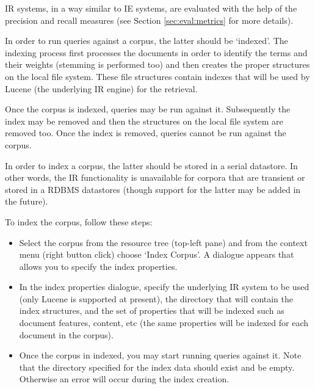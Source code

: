 IR systems, in a way similar to IE systems, are evaluated with the
help of the precision and recall measures (see Section
\ref{sec:eval:metrics} for more details).



In order to run queries against a corpus, the latter should be
`indexed'. The indexing process first processes the documents in order
to identify the terms and their weights (stemming is performed too)
and then creates the proper structures on the local file system. These
file structures contain indexes that will be used by Lucene (the
underlying IR engine) for the retrieval.

Once the corpus is indexed, queries may be run against
it. Subsequently the index may be removed and then the structures on
the local file system are removed too. Once the index is removed,
queries cannot be run against the corpus.


In order to index a corpus, the latter should be stored in a serial
datastore. In other words, the IR functionality is unavailable for
corpora that are transient or stored in a RDBMS datastores (though
support for the latter may be added in the future).

To index the corpus, follow these steps:

\begin{itemize}
%
\item
Select the corpus from the resource tree (top-left pane) and from the
context menu (right button click) choose `Index Corpus'. A dialogue
appears that allows you to specify the index properties.
%
\item
In the index properties dialogue, specify the underlying IR system to
be used (only Lucene is supported at present), the directory that will
contain the index structures, and the set of properties that will be
indexed such as document features, content, etc (the same properties
will be indexed for each document in the corpus).
%
\item
Once the corpus in indexed, you may start running queries against
it. Note that the directory specified  for the index data should exist
and be empty. Otherwise an error will occur during the index creation.
%
\end{itemize}

